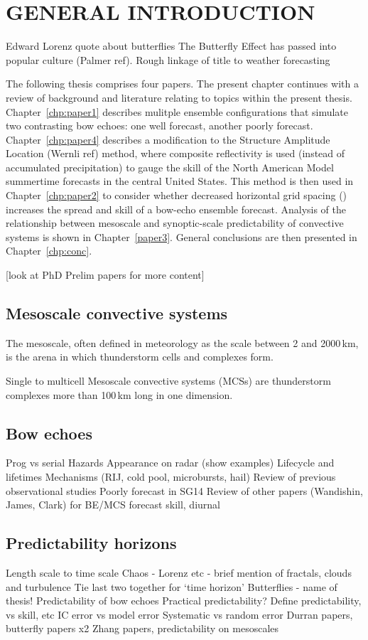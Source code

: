 \chapter{GENERAL INTRODUCTION}
Edward Lorenz quote about butterflies
The Butterfly Effect has passed into popular culture (Palmer ref). 
Rough linkage of title to weather forecasting

The following thesis comprises four papers. The present chapter continues with a review of background and literature relating to topics within the present thesis. Chapter~\ref{chp:paper1} describes mulitple ensemble configurations that simulate two contrasting bow echoes: one well forecast, another poorly forecast. Chapter~\ref{chp:paper4} describes a modification to the Structure Amplitude Location (Wernli ref) method, where composite reflectivity is used (instead of accumulated precipitation) to gauge the skill of the North American Model summertime forecasts in the central United States. This method is then used in Chapter~\ref{chp:paper2} to consider whether decreased horizontal grid spacing (\dx) increases the spread and skill of a bow-echo ensemble forecast. Analysis of the relationship between mesoscale and synoptic-scale predictability of convective systems is shown in Chapter~\ref{paper3}. General conclusions are then presented in Chapter~\ref{chp:conc}.

[look at PhD Prelim papers for more content]

\section{Mesoscale convective systems}
The mesoscale, often defined in meteorology as the scale between 2 and 2000\,km, is the arena in which thunderstorm cells and complexes form.

Single to multicell
Mesoscale convective systems (MCSs) are thunderstorm complexes more than 100\,km long in one dimension.

\section{Bow echoes}
Prog vs serial
Hazards
Appearance on radar (show examples)
Lifecycle and lifetimes
Mechanisms (RIJ, cold pool, microbursts, hail)
Review of previous observational studies
Poorly forecast in SG14
Review of other papers (Wandishin, James, Clark) for BE/MCS forecast skill, diurnal

\section{Predictability horizons}
Length scale to time scale
Chaos - Lorenz etc - brief mention of fractals, clouds and turbulence
Tie last two together for `time horizon'
Butterflies - name of thesis! Predictability of bow echoes
Practical predictability?
Define predictability, vs skill, etc
IC error vs model error
Systematic vs random error
Durran papers, butterfly papers x2
Zhang papers, predictability on mesoscales

